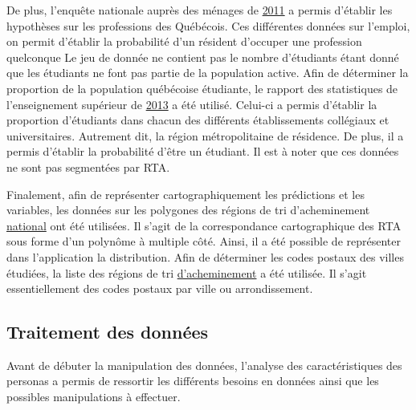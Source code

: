 \documentclass[11pt,french]{article}\usepackage[]{graphicx}\usepackage[]{color}
\begin{document}
De plus, l'enquête nationale auprès des ménages de \href{http://www12.statcan.gc.ca/nhs-enm/2011/dp-pd/dt-td/Rp-fra.cfm?TABID=2&LANG=F&A=R&APATH=3&DETAIL=0&DIM=0&FL=A&FREE=0&GC=24&GL=-1&GID=1118301&GK=1&GRP=1&O=D&PID=106042&PRID=0&PTYPE=105277&S=0&SHOWALL=0&SUB=0&Temporal=2013&THEME=96&VID=0&VNAMEE=&VNAMEF=&D1=2&D2=0&D3=0&D4=0&D5=0&D6=0}{2011} a permis d'établir les hypothèses sur les professions des Québécois. Ces différentes données sur l'emploi, on permit d'établir la probabilité d'un résident d'occuper une profession quelconque Le jeu de donnée ne contient pas le nombre d'étudiants étant donné que les étudiants ne font pas partie de la population active. Afin de déterminer la proportion de la population québécoise étudiante, le rapport des statistiques de l'enseignement supérieur de \href{http://www.education.gouv.qc.ca/fileadmin/administration/librairies/documents/Ministere/acces_info/Statistiques/Statistiques_ES/Statistiques_enseignement_superieur_2013.pdf}{2013} a été utilisé. Celui-ci a permis d'établir la proportion d'étudiants dans chacun des différents établissements collégiaux et universitaires. Autrement dit, la région métropolitaine de résidence. De plus, il a permis d'établir la probabilité d'être un étudiant. Il est à noter que ces données ne sont pas segmentées par RTA.
\newline

Finalement, afin de représenter cartographiquement les prédictions et les variables, les données sur les polygones des régions de tri d'acheminement \href{http://www12.statcan.gc.ca/census-recensement/2011/geo/bound-limit/bound-limit-2016-fra.cfm}{national} ont été utilisées. Il s'agit de la correspondance cartographique des RTA sous forme d'un polynôme à multiple côté. Ainsi, il a été possible de représenter dans l'application la distribution. Afin de déterminer les codes postaux des villes étudiées, la liste des régions de tri \href{https://fr.wikipedia.org/wiki/Liste_des_codes_postaux_canadiens_débutant_par_J}{d'acheminement} a été utilisée. Il s'agit essentiellement des codes postaux par ville ou arrondissement.


\subsection{Traitement des données}

Avant de débuter la manipulation des données, l'analyse des caractéristiques des personas a permis de ressortir les différents besoins en données ainsi que les possibles manipulations à effectuer. 
\end{document}
